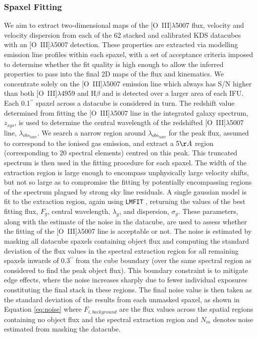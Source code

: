 \documentclass[fleqn,usenatbib]{mn2e}
\begin{document}
\subsubsection{Spaxel Fitting}\label{subsubsection:spaxel_fitting}
We aim to extract two-dimensional maps of the [O~{\sc III}]$\lambda$5007 flux, velocity and velocity dispersion from each of the 62 stacked and calibrated KDS datacubes with an [O~{\sc III}]$\lambda$5007 detection.
These properties are extracted via modelling emission line profiles within each spaxel, with a set of acceptance criteria imposed to determine whether the fit quality is high enough to allow the inferred properties to pass into the final 2D maps of the flux and kinematics.
We concentrate solely on the [O~{\sc III}]$\lambda$5007 emission line which always has S/N higher than both [O~{\sc III}]$\lambda$4959 and H$\beta$ and is detected over a larger area of each IFU. \\

Each 0.1$^{\prime\prime}$ spaxel across a datacube is considered in turn.
The redshift value determined from fitting the [O~{\sc III}]$\lambda$5007 line in the integrated galaxy spectrum, $z_{sys}$, is used to determine the central wavelength of the redshifted [O~{\sc III}]$\lambda$5007 line, $\lambda_{obs_{5007}}$. 
We search a narrow region around $\lambda_{obs_{5007}}$ for the peak flux, assumed to correspond to the ionised gas emission, and extract a 5$\AA$ region (corresponding to 20 spectral elements) centred on this peak.
This truncated spectrum is then used in the fitting procedure for each spaxel.
The width of the extraction region is large enough to encompass unphysically large velocity shifts, but not so large as to compromise the fitting by potentially encompassing regions of the spectrum plagued by strong sky line residuals.
A single gaussian model is fit to the extraction region, again using {\tt LMFIT} \citep{Newville2014}, returning the values of the best fitting flux, $F_{g}$, central wavelength, $\lambda_{g}$, and dispersion, $\sigma_{g}$.
These parameters, along with the estimate of the noise in the datacube, are used to assess whether the fitting of the [O~{\sc III}]$\lambda$5007 line is acceptable or not. 
The noise is estimated by masking all datacube spaxels containing object flux and computing the standard deviation of the flux values in the spectral extraction region for all remaining spaxels inwards of 0.3$^{\prime\prime}$ from the cube boundary (over the same spectral region as considered to find the peak object flux).
This boundary constraint is to mitigate edge effects, where the noise increases sharply due to fewer individual exposures constituting the final stack in these regions.
The final noise value is then taken as the standard deviation of the results from each unmasked spaxel, as shown in Equation \ref{eq:noise} where $F_{i,background}$ are the flux values across the spatial regions containing no object flux and the spectral extraction region and $N_{m}$ denotes noise estimated from masking the datacube.
\end{document}
